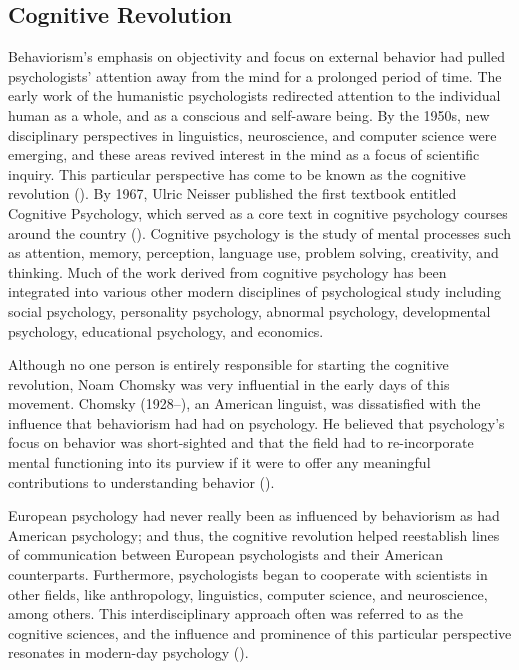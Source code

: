 \documentclass[
]{krantz}
\begin{document}
\subsection*{Cognitive Revolution}\label{cognitive-revolution}


Behaviorism's emphasis on objectivity and focus on external behavior had pulled psychologists' attention away from the mind for a prolonged period of time. The early work of the humanistic psychologists redirected attention to the individual human as a whole, and as a conscious and self-aware being. By the 1950s, new disciplinary perspectives in linguistics, neuroscience, and computer science were emerging, and these areas revived interest in the mind as a focus of scientific inquiry. This particular perspective has come to be known as the cognitive revolution (). By 1967, Ulric Neisser published the first textbook entitled Cognitive Psychology, which served as a core text in cognitive psychology courses around the country (). Cognitive psychology is the study of mental processes such as attention, memory, perception, language use, problem solving, creativity, and thinking. Much of the work derived from cognitive psychology has been integrated into various other modern disciplines of psychological study including social psychology, personality psychology, abnormal psychology, developmental psychology, educational psychology, and economics.

Although no one person is entirely responsible for starting the cognitive revolution, Noam Chomsky was very influential in the early days of this movement. Chomsky (1928--), an American linguist, was dissatisfied with the influence that behaviorism had had on psychology. He believed that psychology's focus on behavior was short-sighted and that the field had to re-incorporate mental functioning into its purview if it were to offer any meaningful contributions to understanding behavior ().

European psychology had never really been as influenced by behaviorism as had American psychology; and thus, the cognitive revolution helped reestablish lines of communication between European psychologists and their American counterparts. Furthermore, psychologists began to cooperate with scientists in other fields, like anthropology, linguistics, computer science, and neuroscience, among others. This interdisciplinary approach often was referred to as the cognitive sciences, and the influence and prominence of this particular perspective resonates in modern-day psychology ().
\end{document}
